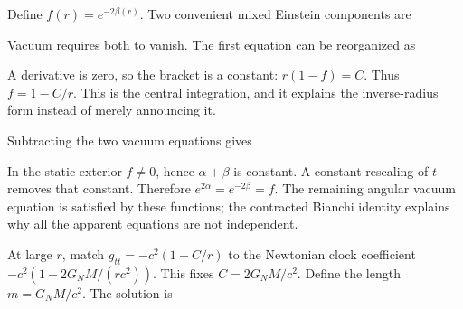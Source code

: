 \documentclass[
  11pt,
  letterpaper,
  oneside,
  openany]{scrbook}
\begin{document}
Define \(f(r)=e^{-2\beta(r)}\). Two convenient mixed Einstein components
are

\begin{center}
\begingroup
{}
\ifdim\wd\grmathbox>\linewidth
\resizebox{\linewidth}{!}{\usebox{\grmathbox}}
\else\usebox{\grmathbox}\fi
\endgroup
\end{center}

Vacuum requires both to vanish. The first equation can be reorganized as

\begin{center}
\begingroup
{}
\ifdim\wd\grmathbox>\linewidth
\resizebox{\linewidth}{!}{\usebox{\grmathbox}}
\else\usebox{\grmathbox}\fi
\endgroup
\end{center}

A derivative is zero, so the bracket is a constant: \(r(1-f)=C\). Thus
\(f=1-C/r\). This is the central integration, and it explains the
inverse-radius form instead of merely announcing it.

Subtracting the two vacuum equations gives

\begin{center}
\begingroup
{}
\ifdim\wd\grmathbox>\linewidth
\resizebox{\linewidth}{!}{\usebox{\grmathbox}}
\else\usebox{\grmathbox}\fi
\endgroup
\end{center}

In the static exterior \(f\ne0\), hence \(\alpha+\beta\) is constant. A
constant rescaling of \(t\) removes that constant. Therefore
\(e^{2\alpha}=e^{-2\beta}=f\). The remaining angular vacuum equation is
satisfied by these functions; the contracted Bianchi identity explains
why all the apparent equations are not independent.

At large \(r\), match \(g_{tt}=-c^2(1-C/r)\) to the Newtonian clock
coefficient \(-c^2(1-2G_NM/(rc^2))\). This fixes \(C=2G_NM/c^2\). Define
the length \(m=G_NM/c^2\). The solution is

\begin{center}
\begingroup
{}
\ifdim\wd\grmathbox>\linewidth
\resizebox{\linewidth}{!}{\usebox{\grmathbox}}
\else\usebox{\grmathbox}\fi
\endgroup
\end{center}
\end{document}
